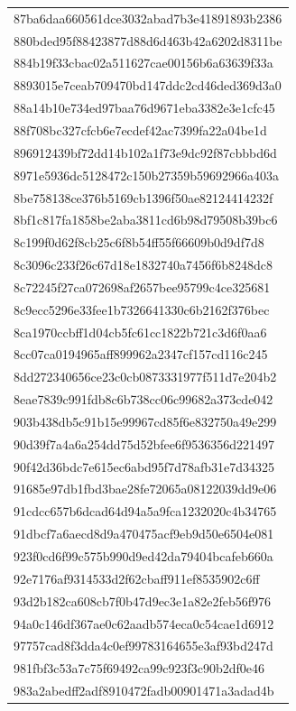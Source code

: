 \begin{tabular}{l}
87ba6daa660561dce3032abad7b3e41891893b2386 \\
880bded95f88423877d88d6d463b42a6202d8311be \\
884b19f33cbac02a511627cae00156b6a63639f33a \\
8893015e7ceab709470bd147ddc2cd46ded369d3a0 \\
88a14b10e734ed97baa76d9671eba3382e3e1cfc45 \\
88f708bc327cfcb6e7ecdef42ac7399fa22a04be1d \\
896912439bf72dd14b102a1f73e9dc92f87cbbbd6d \\
8971e5936dc5128472c150b27359b59692966a403a \\
8be758138ce376b5169cb1396f50ae82124414232f \\
8bf1c817fa1858be2aba3811cd6b98d79508b39bc6 \\
8c199f0d62f8cb25c6f8b54ff55f66609b0d9df7d8 \\
8c3096c233f26c67d18e1832740a7456f6b8248dc8 \\
8c72245f27ca072698af2657bee95799c4ce325681 \\
8c9ecc5296e33fee1b7326641330c6b2162f376bec \\
8ca1970ccbff1d04cb5fc61cc1822b721c3d6f0aa6 \\
8cc07ca0194965aff899962a2347cf157cd116c245 \\
8dd272340656ce23c0cb0873331977f511d7e204b2 \\
8eae7839c991fdb8c6b738cc06c99682a373cde042 \\
903b438db5c91b15e99967cd85f6e832750a49e299 \\
90d39f7a4a6a254dd75d52bfee6f9536356d221497 \\
90f42d36bdc7e615ec6abd95f7d78afb31e7d34325 \\
91685e97db1fbd3bae28fe72065a08122039dd9e06 \\
91cdcc657b6dcad64d94a5a9fca1232020c4b34765 \\
91dbcf7a6aecd8d9a470475acf9eb9d50e6504e081 \\
923f0cd6f99c575b990d9ed42da79404bcafeb660a \\
92e7176af9314533d2f62cbaff911ef8535902c6ff \\
93d2b182ca608cb7f0b47d9ec3e1a82e2feb56f976 \\
94a0c146df367ae0c62aadb574eca0c54cae1d6912 \\
97757cad8f3dda4c0ef99783164655e3af93bd247d \\
981fbf3c53a7c75f69492ca99c923f3c90b2df0e46 \\
983a2abedff2adf8910472fadb00901471a3adad4b \\

\end{tabular}
